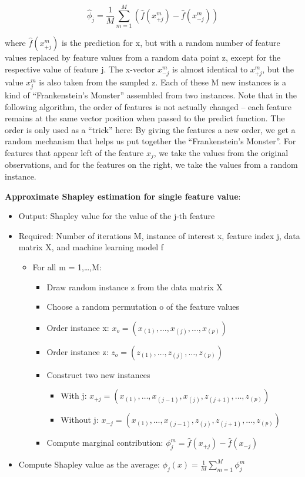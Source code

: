 \documentclass[
  11pt,
]{scrbook}
\providecommand{\tightlist}{%
  \setlength{\itemsep}{0pt}\setlength{\parskip}{0pt}}
\begin{document}
\[\hat{\phi}_{j}=\frac{1}{M}\sum_{m=1}^M\left(\hat{f}(x^{m}_{+j})-\hat{f}(x^{m}_{-j})\right)\]

where \(\hat{f}(x^{m}_{+j})\) is the prediction for x, but with a random number of feature values replaced by feature values from a random data point z, except for the respective value of feature j.
The x-vector \(x^{m}_{-j}\) is almost identical to \(x^{m}_{+j}\), but the value \(x_j^{m}\) is also taken from the sampled z.
Each of these M new instances is a kind of ``Frankenstein's Monster'' assembled from two instances.
Note that in the following algorithm, the order of features is not actually changed -- each feature remains at the same vector position when passed to the predict function.
The order is only used as a ``trick'' here:
By giving the features a new order, we get a random mechanism that helps us put together the ``Frankenstein's Monster''.
For features that appear left of the feature \(x_j\), we take the values from the original observations, and for the features on the right, we take the values from a random instance.

\textbf{Approximate Shapley estimation for single feature value}:

\begin{itemize}
\tightlist
\item
  Output: Shapley value for the value of the j-th feature
\item
  Required: Number of iterations M, instance of interest x, feature index j, data matrix X, and machine learning model f

  \begin{itemize}
  \tightlist
  \item
    For all m = 1,\ldots,M:

    \begin{itemize}
    \tightlist
    \item
      Draw random instance z from the data matrix X
    \item
      Choose a random permutation o of the feature values
    \item
      Order instance x: \(x_o=(x_{(1)},\ldots,x_{(j)},\ldots,x_{(p)})\)
    \item
      Order instance z: \(z_o=(z_{(1)},\ldots,z_{(j)},\ldots,z_{(p)})\)
    \item
      Construct two new instances

      \begin{itemize}
      \tightlist
      \item
        With j: \(x_{+j}=(x_{(1)},\ldots,x_{(j-1)},x_{(j)},z_{(j+1)},\ldots,z_{(p)})\)
      \item
        Without j: \(x_{-j}=(x_{(1)},\ldots,x_{(j-1)},z_{(j)},z_{(j+1)},\ldots,z_{(p)})\)
      \end{itemize}
    \item
      Compute marginal contribution: \(\phi_j^{m}=\hat{f}(x_{+j})-\hat{f}(x_{-j})\)
    \end{itemize}
  \end{itemize}
\item
  Compute Shapley value as the average: \(\phi_j(x)=\frac{1}{M}\sum_{m=1}^M\phi_j^{m}\)
\end{itemize}
\end{document}
